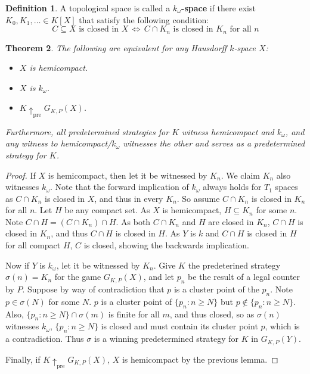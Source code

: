\documentclass[11pt]{article}
\theoremstyle{plain}
\newtheorem{theorem}{Theorem}
\theoremstyle{definition}
\newtheorem{definition}[theorem]{Definition}
\theoremstyle{remark}
\newcommand{\prewin}{\uparrow_{\text{pre}}}
\begin{document}
\begin{definition}
A topological space is called a \textbf{$k_\omega$-space} if there exist $K_0,K_1,\dots \in K[X]$ that satisfy the following condition: \[C \subseteq X \text{ is closed in } X\, \Leftrightarrow \, C \cap K_n \text{ is closed in } K_n \text{ for all } n\]
\end{definition}

\begin{theorem}
The following are equivalent for any Hausdorff $k$-space $X$:
  \begin{itemize}
  \item $X$ is hemicompact.
  \item $X$ is $k_{\omega}$.
  \item $K \prewin G_{K,P}(X)$.
  \end{itemize}
Furthermore, all predetermined strategies for $K$ witness hemicompact and $k_\omega$, and any witness to hemicompact/$k_\omega$ witnesses the other and serves as a predetermined strategy for $K$.
\end{theorem}

\begin{proof}
If $X$ is hemicompact, then let it be witnessed by $K_n$. We claim $K_n$ also witnesses $k_\omega$. Note that the forward implication of $k_\omega$ always holds for $T_1$ spaces as $C\cap K_n$ is closed in $X$, and thus in every $K_n$. So assume $C\cap K_n$ is closed in $K_n$ for all $n$. Let $H$ be any compact set. As $X$ is hemicompact, $H\subseteq K_n$ for some $n$. Note $C\cap H = (C\cap K_n)\cap H$. As both $C \cap K_n$ and $H$ are closed in $K_n$, $C\cap H$ is closed in $K_n$, and thus $C\cap H$ is closed in $H$. As $Y$ is $k$ and $C\cap H$ is closed in $H$ for all compact $H$, $C$ is closed, showing the backwards implication.

Now if $Y$ is $k_\omega$, let it be witnessed by $K_n$. Give $K$ the predeterined strategy $\sigma(n)=K_n$ for the game $G_{K,P}(X)$, and let $p_n$ be the result of a legal counter by $P$. Suppose by way of contradiction that $p$ is a cluster point of the $p_n$. Note $p\in \sigma(N)$ for some $N$. $p$ is a cluster point of $\{p_n : n\geq N\}$ but $p\not\in \{p_n : n \geq N\}$. Also, $\{p_n : n \geq N\} \cap \sigma(m)$ is finite for all $m$, and thus closed, so as $\sigma(n)$ witnesses $k_\omega$, $\{p_n : n\geq N\}$ is closed and must contain its cluster point $p$, which is a contradiction. Thus $\sigma$ is a winning predetermined strategy for $K$ in $G_{K,P}(Y)$.

Finally, if $K \prewin G_{K,P}(X)$, $X$ is hemicompact by the previous lemma.
\end{proof}
\end{document}
